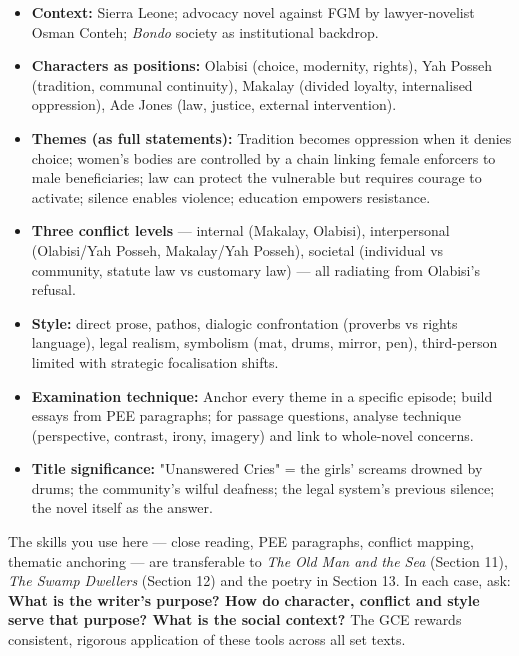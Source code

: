 \documentclass[11pt]{article}
\begin{document}
\begin{aretenir}
\begin{itemize}
\item \textbf{Context:} Sierra Leone; advocacy novel against FGM by lawyer-novelist Osman Conteh; \emph{Bondo} society as institutional backdrop.
\item \textbf{Characters as positions:} Olabisi (choice, modernity, rights), Yah Posseh (tradition, communal continuity), Makalay (divided loyalty, internalised oppression), Ade Jones (law, justice, external intervention).
\item \textbf{Themes (as full statements):} Tradition becomes oppression when it denies choice; women's bodies are controlled by a chain linking female enforcers to male beneficiaries; law can protect the vulnerable but requires courage to activate; silence enables violence; education empowers resistance.
\item \textbf{Three conflict levels} --- internal (Makalay, Olabisi), interpersonal (Olabisi/Yah Posseh, Makalay/Yah Posseh), societal (individual vs community, statute law vs customary law) --- all radiating from Olabisi's refusal.
\item \textbf{Style:} direct prose, pathos, dialogic confrontation (proverbs vs rights language), legal realism, symbolism (mat, drums, mirror, pen), third-person limited with strategic focalisation shifts.
\item \textbf{Examination technique:} Anchor every theme in a specific episode; build essays from PEE paragraphs; for passage questions, analyse technique (perspective, contrast, irony, imagery) and link to whole-novel concerns.
\item \textbf{Title significance:} "Unanswered Cries" = the girls' screams drowned by drums; the community's wilful deafness; the legal system's previous silence; the novel itself as the answer.
\end{itemize}
\end{aretenir}

\begin{savaistu}
The skills you use here --- close reading, PEE paragraphs, conflict mapping, thematic anchoring --- are transferable to \emph{The Old Man and the Sea} (Section 11), \emph{The Swamp Dwellers} (Section 12) and the poetry in Section 13. In each case, ask: \textbf{What is the writer's purpose? How do character, conflict and style serve that purpose? What is the social context?} The GCE rewards consistent, rigorous application of these tools across all set texts.
\end{savaistu}
\end{document}
